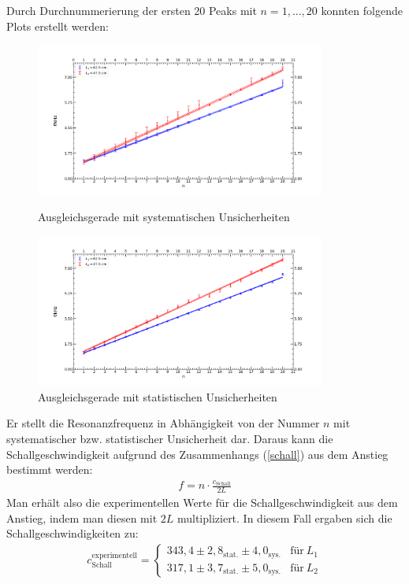 \documentclass[german,  %
parskip=full,  %
]{scrartcl}
\begin{document}
Durch Durchnummerierung der ersten 20 Peaks mit $n=1,...,20$ konnten folgende Plots erstellt werden: 
\begin{figure}[h!]
\centering
\includegraphics[width=0.85\textwidth]{421_systematische_Unsicherheiten.png}
\caption{Ausgleichsgerade mit systematischen Unsicherheiten}
\includegraphics[width=0.85\textwidth]{421_statistische_Unsicherheiten.png}
\caption{Ausgleichsgerade mit statistischen Unsicherheiten}
\end{figure} 
\newpage
Er stellt die Resonanzfrequenz in Abhängigkeit von der Nummer $n$ mit systematischer bzw. statistischer Unsicherheit dar. Daraus kann die Schallgeschwindigkeit aufgrund des Zusammenhangs (\ref{schall}) aus dem Anstieg bestimmt werden:
\begin{align}
\label{schall} f = n \cdot\frac{c_{\mathrm{Schall}}}{2L}
\end{align}
Man erhält also die experimentellen Werte für die Schallgeschwindigkeit aus dem Anstieg, indem man diesen mit $2L$ multipliziert. In diesem Fall ergaben sich die Schallgeschwindigkeiten zu:
\begin{align}
c_{\mathrm{Schall}}^{\mathrm{experimentell}} =
  \begin{cases}
    343,4 \pm 2,8_{\mathrm{stat.}} \pm 4,0_{\mathrm{sys.}}  & \text{für} \ L_{1}  \\
	317,1 \pm 3,7_{\mathrm{stat.}} \pm 5,0_{\mathrm{sys.}} & \text{für} \ L_{2}
  \end{cases}
\end{align}
\end{document}

